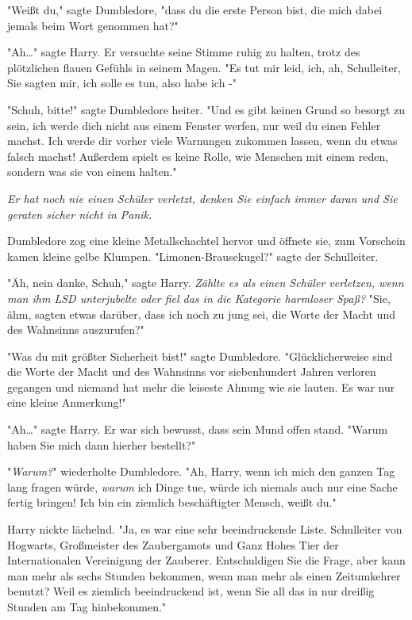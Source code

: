 {"Weißt du," sagte Dumbledore, "dass du die erste Person bist, die mich dabei jemals beim Wort genommen hat?"

"Ah…" sagte Harry. Er versuchte seine Stimme ruhig zu halten, trotz des plötzlichen flauen Gefühls in seinem Magen. "Es tut mir leid, ich, ah, Schulleiter, Sie sagten mir, ich solle es tun, also habe ich -"

"Schuh, bitte!" sagte Dumbledore heiter. "Und es gibt keinen Grund so besorgt zu sein, ich werde dich nicht aus einem Fenster werfen, nur weil du einen Fehler machst. Ich werde dir vorher viele Warnungen zukommen lassen, wenn du etwas falsch machst! Außerdem spielt es keine Rolle, wie Menschen mit einem reden, sondern was sie von einem halten."

\emph{Er hat noch nie einen Schüler verletzt, denken Sie einfach immer daran und Sie geraten sicher nicht in Panik.}

Dumbledore zog eine kleine Metallschachtel hervor und öffnete sie, zum Vorschein kamen kleine gelbe Klumpen. "Limonen-Brausekugel?" sagte der Schulleiter.

"Äh, nein danke, Schuh," sagte Harry. \emph{Zählte es als einen Schüler verletzen, wenn man ihm LSD unterjubelte oder fiel das in die Kategorie harmloser Spaß?} "Sie, ähm, sagten etwas darüber, dass ich noch zu jung sei, die Worte der Macht und des Wahnsinns auszurufen?"

"Was du mit größter Sicherheit bist!" sagte Dumbledore. "Glücklicherweise sind die Worte der Macht und des Wahnsinns vor siebenhundert Jahren verloren gegangen und niemand hat mehr die leiseste Ahnung wie sie lauten. Es war nur eine kleine Anmerkung!"

"Ah…" sagte Harry. Er war sich bewusst, dass sein Mund offen stand. "Warum haben Sie mich dann hierher bestellt?"

"\emph{Warum?}" wiederholte Dumbledore. "Ah, Harry, wenn ich mich den ganzen Tag lang fragen würde, \emph{warum} ich Dinge tue, würde ich niemals auch nur eine Sache fertig bringen! Ich bin ein ziemlich beschäftigter Mensch, weißt du."

Harry nickte lächelnd. "Ja, es war eine sehr beeindruckende Liste. Schulleiter von Hogwarts, Großmeister des Zaubergamots und Ganz Hohes Tier der Internationalen Vereinigung der Zauberer. Entschuldigen Sie die Frage, aber kann man mehr als sechs Stunden bekommen, wenn man mehr als einen Zeitumkehrer benutzt? Weil es ziemlich beeindruckend ist, wenn Sie all das in nur dreißig Stunden am Tag hinbekommen."

}
